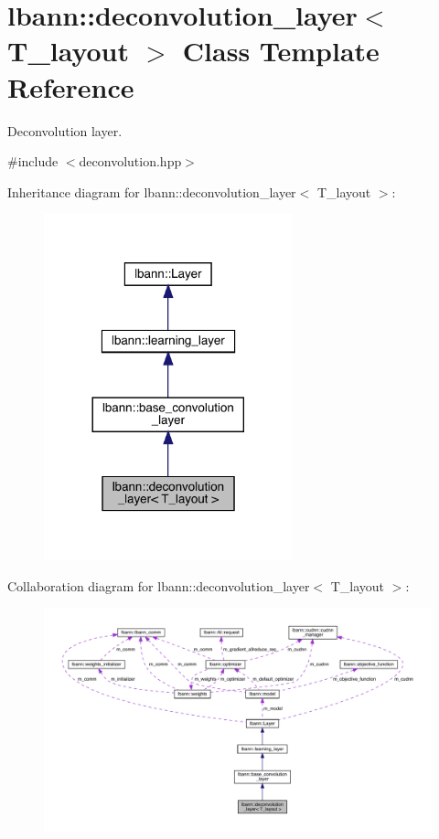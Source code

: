 \hypertarget{classlbann_1_1deconvolution__layer}{}\section{lbann\+:\+:deconvolution\+\_\+layer$<$ T\+\_\+layout $>$ Class Template Reference}
\label{classlbann_1_1deconvolution__layer}


Deconvolution layer.  




{\ttfamily \#include $<$deconvolution.\+hpp$>$}



Inheritance diagram for lbann\+:\+:deconvolution\+\_\+layer$<$ T\+\_\+layout $>$\+:\nopagebreak
\begin{figure}[H]
\begin{center}
\leavevmode
\includegraphics[width=204pt]{classlbann_1_1deconvolution__layer__inherit__graph}
\end{center}
\end{figure}


Collaboration diagram for lbann\+:\+:deconvolution\+\_\+layer$<$ T\+\_\+layout $>$\+:\nopagebreak
\begin{figure}[H]
\begin{center}
\leavevmode
\includegraphics[width=350pt]{classlbann_1_1deconvolution__layer__coll__graph}
\end{center}
\end{figure}
